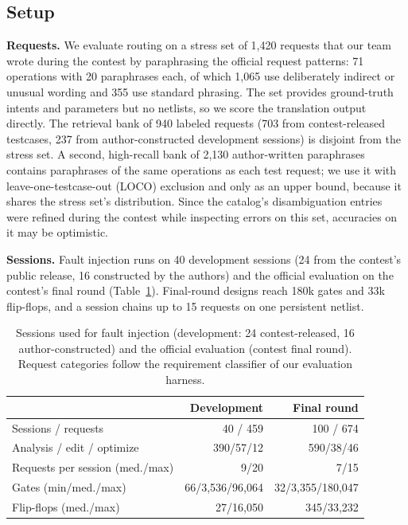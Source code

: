\documentclass[conference,letterpaper]{IEEEtran}
\begin{document}
\subsection{Setup}
\label{sec:setup}

\textbf{Requests.} We evaluate routing on a stress set of 1,420 requests that
our team wrote during the contest by paraphrasing the official request
patterns: 71 operations with 20 paraphrases each, of which 1,065 use
deliberately indirect or unusual wording and 355 use standard phrasing. The
set provides ground-truth intents and parameters but no netlists, so we score
the translation output directly. The retrieval bank of 940 labeled requests (703
from contest-released testcases, 237 from author-constructed development
sessions) is disjoint from the stress set. A second,
high-recall bank of 2,130 author-written paraphrases contains paraphrases of
the same operations as each test request; we use it with
leave-one-testcase-out (LOCO) exclusion and only as an upper bound, because it
shares the stress set's distribution. Since the catalog's disambiguation
entries were refined during the contest while inspecting errors on this set,
accuracies on it may be optimistic.

\textbf{Sessions.} Fault injection runs on 40 development sessions (24 from
the contest's public release, 16 constructed by the authors) and the official
evaluation on the contest's final round (Table~\ref{tab:testbed}). Final-round designs reach 180k gates and 33k
flip-flops, and a session chains up to 15 requests on one persistent netlist.

\begin{table}[t]
\caption{Sessions used for fault injection (development: 24 contest-released,
16 author-constructed) and the official evaluation (contest final round). Request categories follow the requirement
classifier of our evaluation harness.}
\label{tab:testbed}
\centering
\footnotesize
\setlength{\tabcolsep}{4pt}
\begin{tabular}{@{}lrr@{}}
\toprule
 & Development & Final round \\
\midrule
Sessions / requests & 40 / 459 & 100 / 674 \\
Analysis / edit / optimize & 390/57/12 & 590/38/46 \\
Requests per session (med./max) & 9/20 & 7/15 \\
Gates (min/med./max) & 66/3,536/96,064 & 32/3,355/180,047 \\
Flip-flops (med./max) & 27/16,050 & 345/33,232 \\
\bottomrule
\end{tabular}
\end{table}
\end{document}
